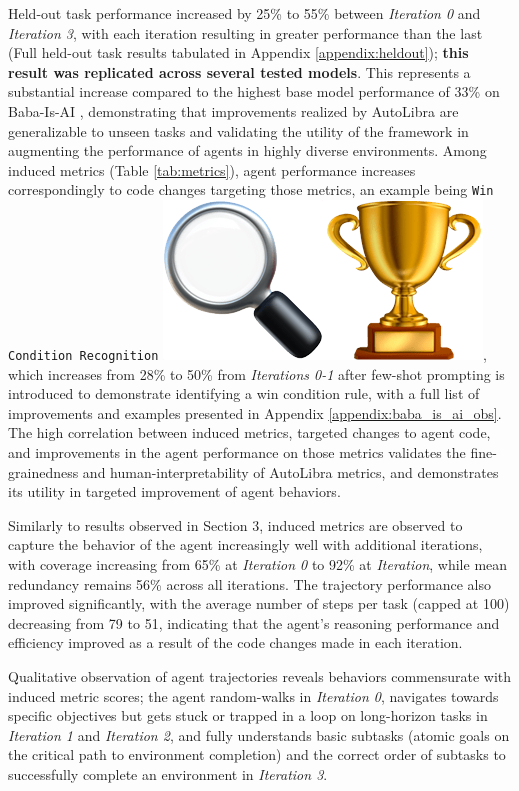 Held-out task performance increased by 25\% to 55\% between \textit{Iteration 0} and \textit{Iteration 3}, with each iteration resulting in greater performance than the last (Full held-out task results tabulated in Appendix \ref{appendix:heldout}); \textbf{this result was replicated across several tested models}. This represents a substantial increase compared to the highest base model performance of 33\% on Baba-Is-AI \citep{paglieri2024balrog}, demonstrating that improvements realized by AutoLibra are generalizable to unseen tasks and validating the utility of the framework in augmenting the performance of agents in highly diverse environments. Among induced metrics (Table \ref{tab:metrics}), agent performance increases correspondingly to code changes targeting those metrics, an example being \texttt{Win Condition Recognition} \includegraphics[scale=0.07]{figs/emojis/emoji_1.png}, which increases from 28\% to 50\% from \textit{Iterations 0-1} after few-shot prompting is introduced to demonstrate identifying a win condition rule, with a full list of improvements and examples presented in Appendix \ref{appendix:baba_is_ai_obs}. The high correlation between induced metrics, targeted changes to agent code, and improvements in the agent performance on those metrics validates the fine-grainedness and human-interpretability of AutoLibra metrics, and demonstrates its utility in targeted improvement of agent behaviors.

Similarly to results observed in Section 3, induced metrics are observed to capture the behavior of the agent increasingly well with additional iterations, with coverage increasing from 65\% at \textit{Iteration 0} to 92\% at \textit{Iteration}, while mean redundancy remains 56\% across all iterations. The trajectory performance also improved significantly, with the average number of steps per task (capped at 100) decreasing from 79 to 51, indicating that the agent's reasoning performance and efficiency improved as a result of the code changes made in each iteration.

Qualitative observation of agent trajectories reveals behaviors commensurate with induced metric scores; the agent random-walks in \textit{Iteration 0}, navigates towards specific objectives but gets stuck or trapped in a loop on long-horizon tasks in \textit{Iteration 1} and \textit{Iteration 2}, and fully understands basic subtasks (atomic goals on the critical path to environment completion) and the correct order of subtasks to successfully complete an environment in \textit{Iteration 3}.

